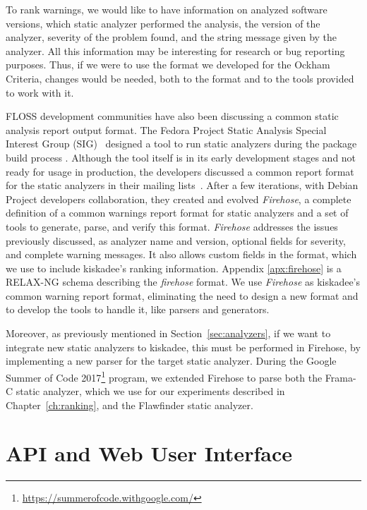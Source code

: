 To rank warnings, we would like to have information on analyzed software
versions, which static analyzer performed the analysis, the version of the
analyzer, severity of the problem found, and the string message given by the
analyzer. All this information may be interesting for research or bug reporting
purposes. Thus, if we were to use the format we developed for the Ockham Criteria,
changes would be needed, both to the format and to the tools provided to work
with it.

FLOSS development communities have also been discussing a common static
analysis report output format. The Fedora Project Static Analysis Special
Interest Group (SIG)~\cite{fedora:static:sig} designed a tool to run static analyzers
during the
package build process \cite{fedora:mockwithanalysis}.  Although the tool itself
is in its early development stages and not ready for usage in production, the
developers discussed a common report format for the static
analyzers in their mailing lists~\cite{fedora:mlist}. After a few iterations, with Debian Project
developers collaboration, they created and evolved \textit{Firehose}, a complete definition
of a common warnings report format for static analyzers and a set of tools to
generate, parse, and verify this format.
\textit{Firehose} addresses the issues previously discussed, as analyzer name
and version, optional fields for severity, and complete warning messages. It also allows custom fields in the format, which we use to include kiskadee's ranking information.
Appendix \ref{apx:firehose} is a RELAX-NG schema describing the
\textit{firehose} format.
We use \textit{Firehose} as kiskadee's
common warning report format, eliminating the need to design a new format and
to develop the tools to handle it, like parsers and generators.

Moreover, as previously  mentioned in Section~\ref{sec:analyzers}, if we want
to integrate new static analyzers to kiskadee, this must be performed in
Firehose, by implementing a new parser for the target static analyzer. During
the Google Summer of Code
2017\footnote{\url{https://summerofcode.withgoogle.com/}} program, we extended
Firehose to parse both the Frama-C static analyzer, which we use for our
experiments described in Chapter~\ref{ch:ranking}, and the Flawfinder static
analyzer.

\section{API and Web User Interface}
\label{sec:api}

